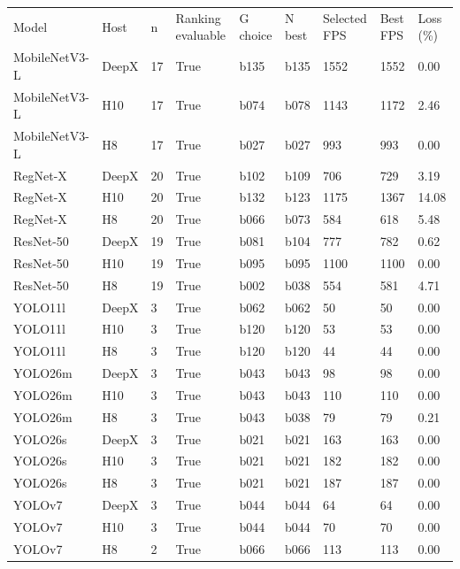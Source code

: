 \begin{tabular}{lllllllll}
Model & Host & n & Ranking evaluable & G choice & N best & Selected FPS & Best FPS & Loss (\%) \\
MobileNetV3-L & DeepX & 17 & True & b135 & b135 & 1552 & 1552 & 0.00 \\
MobileNetV3-L & H10 & 17 & True & b074 & b078 & 1143 & 1172 & 2.46 \\
MobileNetV3-L & H8 & 17 & True & b027 & b027 & 993 & 993 & 0.00 \\
RegNet-X & DeepX & 20 & True & b102 & b109 & 706 & 729 & 3.19 \\
RegNet-X & H10 & 20 & True & b132 & b123 & 1175 & 1367 & 14.08 \\
RegNet-X & H8 & 20 & True & b066 & b073 & 584 & 618 & 5.48 \\
ResNet-50 & DeepX & 19 & True & b081 & b104 & 777 & 782 & 0.62 \\
ResNet-50 & H10 & 19 & True & b095 & b095 & 1100 & 1100 & 0.00 \\
ResNet-50 & H8 & 19 & True & b002 & b038 & 554 & 581 & 4.71 \\
YOLO11l & DeepX & 3 & True & b062 & b062 & 50 & 50 & 0.00 \\
YOLO11l & H10 & 3 & True & b120 & b120 & 53 & 53 & 0.00 \\
YOLO11l & H8 & 3 & True & b120 & b120 & 44 & 44 & 0.00 \\
YOLO26m & DeepX & 3 & True & b043 & b043 & 98 & 98 & 0.00 \\
YOLO26m & H10 & 3 & True & b043 & b043 & 110 & 110 & 0.00 \\
YOLO26m & H8 & 3 & True & b043 & b038 & 79 & 79 & 0.21 \\
YOLO26s & DeepX & 3 & True & b021 & b021 & 163 & 163 & 0.00 \\
YOLO26s & H10 & 3 & True & b021 & b021 & 182 & 182 & 0.00 \\
YOLO26s & H8 & 3 & True & b021 & b021 & 187 & 187 & 0.00 \\
YOLOv7 & DeepX & 3 & True & b044 & b044 & 64 & 64 & 0.00 \\
YOLOv7 & H10 & 3 & True & b044 & b044 & 70 & 70 & 0.00 \\
YOLOv7 & H8 & 2 & True & b066 & b066 & 113 & 113 & 0.00 \\
\end{tabular}
